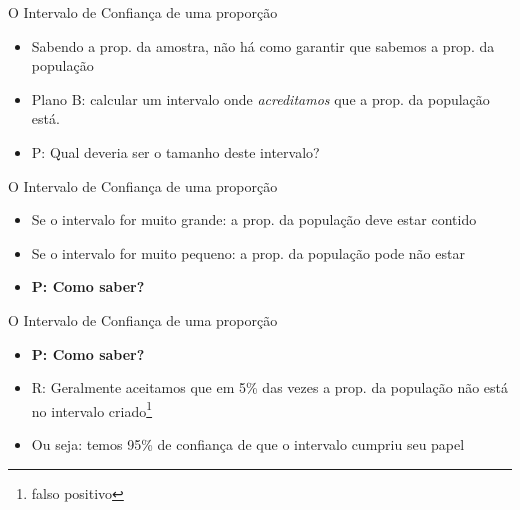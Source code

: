 \documentclass{beamer}
\begin{document}
\begin{frame}{\scriptsize O Intervalo de Confiança de uma proporção}
  \begin{itemize}
    \footnotesize
  \item<1> Sabendo a prop. da amostra, não há como garantir que sabemos a prop. da população
    \bigskip
  \item<2-> Plano B: calcular um intervalo onde {\em acreditamos} que a prop. da população está.
    \bigskip
  \item<3> P: Qual deveria ser o tamanho deste intervalo?
  \end{itemize}
\end{frame}

\begin{frame}{\scriptsize O Intervalo de Confiança de uma proporção}
  \begin{itemize}
    \footnotesize
  \item<1,3> Se o intervalo for muito grande: a prop. da população deve estar contido
    \bigskip
  \item<2,3> Se o intervalo for muito pequeno: a prop. da população pode não estar
    \bigskip
  \item<3> {\bf P: Como saber?}
  \end{itemize}
\end{frame}

\begin{frame}{\scriptsize O Intervalo de Confiança de uma proporção}
  \begin{itemize}
    \footnotesize
  \item {\bf P: Como saber?}
    \bigskip
  \item R: Geralmente aceitamos que em 5\% das vezes a prop. da população não está no intervalo criado\footnote{\scriptsize falso positivo}
  \bigskip
  \item Ou seja: temos \alert{95\% de confiança} de que o intervalo cumpriu seu papel
  \end{itemize}
\end{frame}
\end{document}
